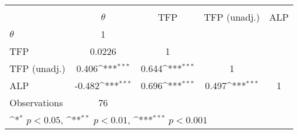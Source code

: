 {
\def\sym#1{\ifmmode^{#1}\else\(^{#1}\)\fi}
\begin{tabular}{l*{4}{c}}
\toprule
                &\multicolumn{4}{c}{}                                                       \\
                & $\theta$         &      TFP         &TFP (unadj.)         &      ALP         \\
\midrule
$\theta$        &        1         &                  &                  &                  \\
TFP             &   0.0226         &        1         &                  &                  \\
TFP (unadj.)    &    0.406\sym{***}&    0.644\sym{***}&        1         &                  \\
ALP             &   -0.482\sym{***}&    0.696\sym{***}&    0.497\sym{***}&        1         \\
\midrule
Observations    &       76         &                  &                  &                  \\
\bottomrule
\multicolumn{5}{l}{\footnotesize \sym{*} \(p<0.05\), \sym{**} \(p<0.01\), \sym{***} \(p<0.001\)}\\
\end{tabular}
}

